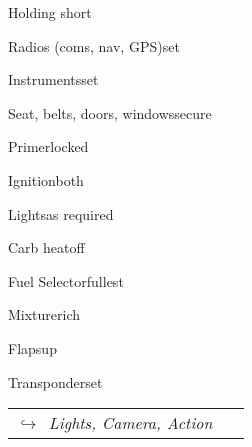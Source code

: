 \begin{multicols}{2}
\begin{checklist}{Holding short}
    \item{Radios (coms, nav, GPS)}{set}
    \item{Instruments}{set}
    \item{Seat, belts, doors, windows}{secure}
    \item{Primer}{locked}
    \item{Ignition}{both}
    \item{Lights}{as required}
    \item{Carb heat}{off}
    \item{Fuel Selector}{fullest}
    \item{Mixture}{rich}
    \item{Flaps}{up}
    \item{Transponder}{set}
\end{checklist}

\begin{tabular}{p{0.9\linewidth}}
    \multicolumn{1}{l}{$\hookrightarrow$\ \textit{Lights, Camera, Action}}
\end{tabular}

\end{multicols}
